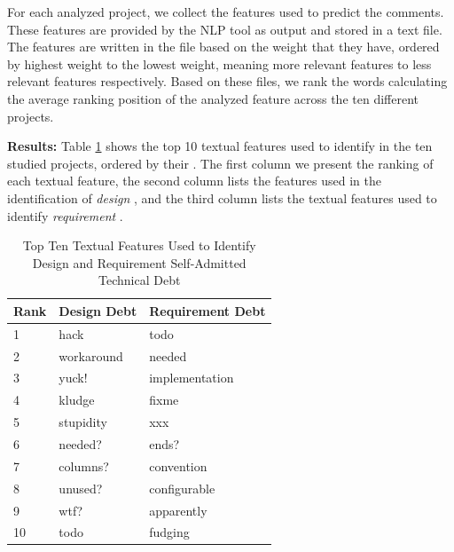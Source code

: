 For each analyzed project, we collect the features used to predict the \SATD comments. These features are provided by the NLP tool as output and stored in a text file. The features are written in the file based on the weight that they have, ordered by highest weight to the lowest weight, meaning more relevant features to less relevant features respectively. Based on these files, we rank the words calculating the average ranking position of the analyzed feature across the ten different projects. 


\noindent \textbf{Results:} Table \ref{tbl:top_ten_features} shows the top 10 textual features used to identify  \SATD in the ten studied projects, ordered by their . The first column we present the ranking of each textual feature, the second column lists the features used in the identification of \emph{design} \SATD, and the third column lists the textual features used to identify \emph{requirement} \SATD.

\begin{table}[!thb]
    \begin{center}
        \caption{Top Ten Textual Features Used to Identify Design and Requirement Self-Admitted Technical Debt}
        \label{tbl:top_ten_features}
        \begin{tabular}{l| l l }
        \toprule
        \textbf{Rank} & \textbf{Design Debt} & \textbf{Requirement Debt}  \\
        \midrule
         1  & hack       &   todo              \\
         2  & workaround &   needed            \\
         3  & yuck!      &   implementation    \\
         4  & kludge     &   fixme             \\
         5  & stupidity  &   xxx               \\
         6  & needed?    &   ends?             \\
         7  & columns?   &   convention        \\
         8  & unused?    &   configurable      \\
         9  & wtf?       &   apparently        \\
         10 & todo       &   fudging           \\
        \bottomrule
        \end{tabular}
    \end{center}    
\end{table}


